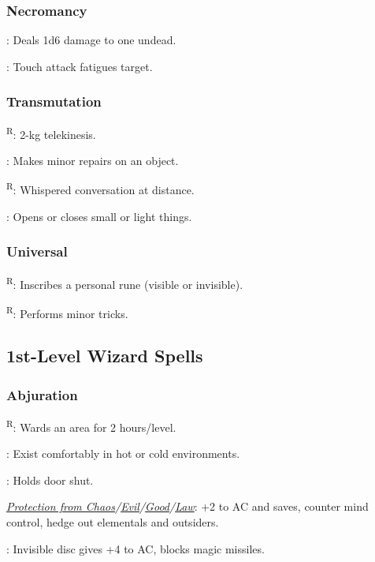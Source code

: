 \subsubsection{Necromancy}
	: Deals 1d6 damage to one undead.

	: Touch attack fatigues target.

\subsubsection{Transmutation}
	\textsuperscript{R}: 2-kg telekinesis.

	: Makes minor repairs on an object.

	\textsuperscript{R}: Whispered conversation at distance.

	: Opens or closes small or light things.

\subsubsection{Universal}
	\textsuperscript{R}: Inscribes a personal rune (visible or invisible).

	\textsuperscript{R}: Performs minor tricks.



\subsection{1st-Level Wizard Spells}

\subsubsection{Abjuration}
	\textsuperscript{R}: Wards an area for 2 hours/level.

	: Exist comfortably in hot or cold environments.

	: Holds door shut.

	\noindent\textit{\hyperref[spell:Protection from Chaos]{Protection from Chaos}/\hyperref[spell:Protection from Evil]{Evil}/\hyperref[spell:Protection from Good]{Good}/\hyperref[spell:Protection from Law]{Law}}: +2 to AC and saves, counter mind control, hedge out elementals and outsiders.

	: Invisible disc gives +4 to AC, blocks magic missiles.

